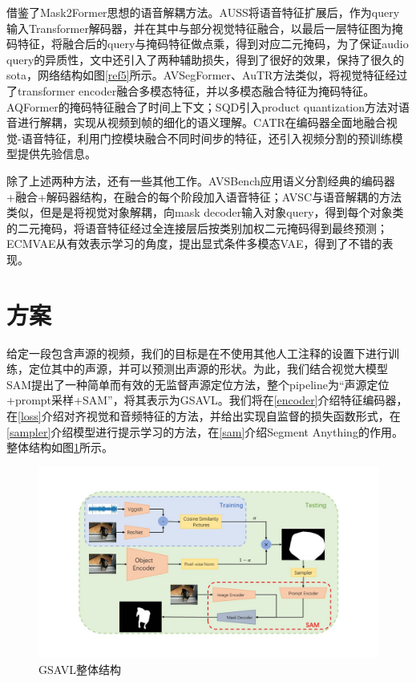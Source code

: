 \documentclass[12pt]{article}
\begin{document}
借鉴了Mask2Former\cite{mask}思想的语音解耦方法。AUSS\cite{s2}将语音特征扩展后，作为query输入Transformer解码器，并在其中与部分视觉特征融合，以最后一层特征图为掩码特征，将融合后的query与掩码特征做点乘，得到对应二元掩码，为了保证audio query的异质性，文中还引入了两种辅助损失，得到了很好的效果，保持了很久的sota，网络结构如图\ref{ref5}所示。AVSegFormer\cite{s3}、AuTR\cite{s4}方法类似，将视觉特征经过了transformer encoder融合多模态特征，并以多模态融合特征为掩码特征。
AQFormer\cite{s7}的掩码特征融合了时间上下文；SQD\cite{s8}引入product quantization方法对语音进行解耦，实现从视频到帧的细化的语义理解。CATR\cite{s10}在编码器全面地融合视觉-语音特征，利用门控模块融合不同时间步的特征，还引入视频分割的预训练模型提供先验信息。

除了上述两种方法，还有一些其他工作。AVSBench\cite{17}应用语义分割经典的编码器+融合+解码器结构，在融合的每个阶段加入语音特征；AVSC\cite{32}与语音解耦的方法类似，但是是将视觉对象解耦，向mask decoder输入对象query，得到每个对象类的二元掩码，将语音特征经过全连接层后按类别加权二元掩码得到最终预测；ECMVAE\cite{s11}从有效表示学习的角度，提出显式条件多模态VAE，得到了不错的表现。



\section{方案}
给定一段包含声源的视频，我们的目标是在不使用其他人工注释的设置下进行训练，定位其中的声源，并可以预测出声源的形状。为此，我们结合视觉大模型SAM提出了一种简单而有效的无监督声源定位方法，整个pipeline为“声源定位+prompt采样+SAM”，将其表示为GSAVL。我们将在\ref{encoder}介绍特征编码器，在\ref{loss}介绍对齐视觉和音频特征的方法，并给出实现自监督的损失函数形式，在\ref{sampler}介绍模型进行提示学习的方法，在\ref{sam}介绍Segment Anything的作用。整体结构如图\ref{refmodel1}所示。
\begin{figure}[!h]
  \centering
  \includegraphics[width=1\linewidth]{model2.jpg}
  \caption{GSAVL整体结构}
    \label{refmodel1}
\end{figure}
\end{document}
